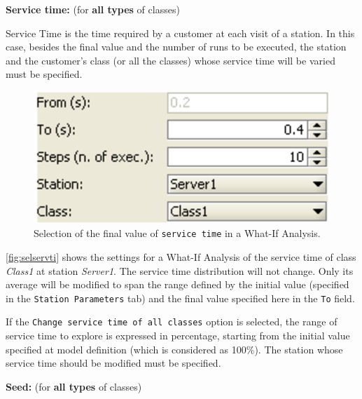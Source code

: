 \begin{itemize*}
\item \textbf{Service time:} (for \textbf{all types} of classes)

Service Time is the time required by a customer at each visit of a
station. In this case, besides the final value and the number of
runs to be executed, the station and the customer's class (or all
the classes) whose service time will be varied must be specified.
\begin{figure}[hbt]
    \begin{center}
        \includegraphics[scale=.5]{img/jsimg/7.6.eps}
    \end{center}
    \caption{Selection of the final value of \texttt{service time}
    in a What-If Analysis.}
    \label{fig:selservti}
\end{figure}
\autoref{fig:selservti} shows the settings for a What-If
Analysis of the service time of class \emph{Class1} at station
\emph{Server1}. The service time distribution will not change.
Only its average will be modified to span the range defined by the
initial value (specified in the \texttt{Station Parameters} tab)
and the final value specified here in the \texttt{To} field.

If the \texttt{Change service time of all classes} option is
selected, the range of service time to explore is expressed in
percentage, starting from the initial value specified at model
definition (which is considered as 100\%). The station whose
service time should be modified must be specified.

\item \textbf{Seed:} (for \textbf{all types} of classes)


\end{itemize*}
